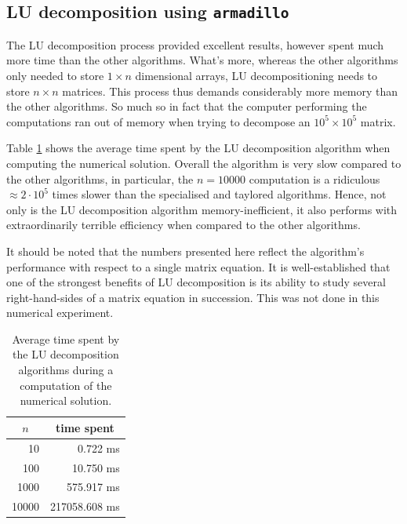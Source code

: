 \documentclass[reprint,english]{revtex4-1}
\begin{document}
\subsection{LU decomposition using \texttt{armadillo}}
The LU decomposition process provided excellent results, however spent much more time than the other algorithms. What's more, whereas the other algorithms only needed to store \(1\times n\) dimensional arrays, LU decompositioning needs to store \(n\times n\) matrices. This process thus demands considerably more memory than the other algorithms. So much so in fact that the computer performing the computations ran out of memory when trying to decompose an \(10^5\times10^5\) matrix.

Table \ref{tab:time_LU_alg} shows the average time spent by the LU decomposition algorithm when computing the numerical solution. Overall the algorithm is very slow compared to the other algorithms, in particular, the \(n=10000\) computation is a ridiculous \(\approx2\cdot10^5\) times slower than the specialised and taylored algorithms. Hence, not only is the LU decomposition algorithm memory-inefficient, it also performs with extraordinarily terrible efficiency when compared to the other algorithms.

It should be noted that the numbers presented here reflect the algorithm's performance with respect to a single matrix equation. It is well-established that one of the strongest benefits of LU decomposition is its ability to study several right-hand-sides of a matrix equation in succession. This was not done in this numerical experiment.
\newpage
\begin{table}[ht]
\caption{Average time spent by the LU decomposition algorithms during a computation of the numerical solution.}\label{tab:time_LU_alg}
\begin{tabular}{|r|r|}
\hline
\multicolumn{1}{|c|}{\(n\)} & \multicolumn{1}{c|}{time spent} \\\hline
   10 &      0.722 ms \\\hline
  100 &     10.750 ms \\\hline
 1000 &    575.917 ms \\\hline
10000 & 217058.608 ms \\\hline
\end{tabular}
\end{table}
\end{document}
